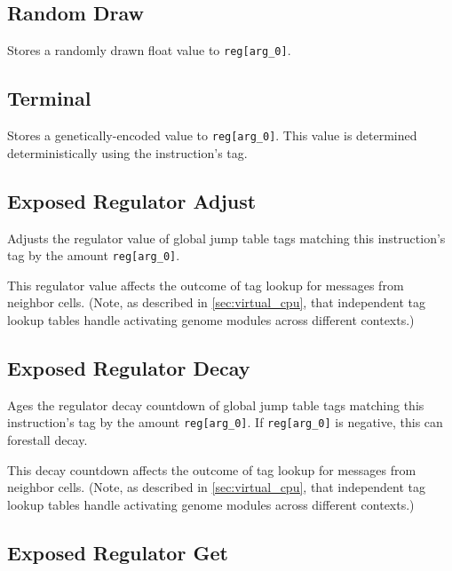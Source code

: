 \subsection{Random Draw}


Stores a randomly drawn float value to \texttt{reg[arg\_0]}.

\subsection{Terminal}


Stores a genetically-encoded value to \texttt{reg[arg\_0]}.
This value is determined deterministically using the instruction's tag.

\subsection{Exposed Regulator Adjust}


Adjusts the regulator value of global jump table tags matching this instruction's tag by the amount \texttt{reg[arg\_0]}.

This regulator value affects the outcome of tag lookup for messages from neighbor cells.
(Note, as described in \ref{sec:virtual_cpu}, that independent tag lookup tables handle activating genome modules across different contexts.)

\subsection{Exposed Regulator Decay}


Ages the regulator decay countdown of global jump table tags matching this instruction's tag by the amount \texttt{reg[arg\_0]}.
If \texttt{reg[arg\_0]} is negative, this can forestall decay.

This decay countdown affects the outcome of tag lookup for messages from neighbor cells.
(Note, as described in \ref{sec:virtual_cpu}, that independent tag lookup tables handle activating genome modules across different contexts.)

\subsection{Exposed Regulator Get}


